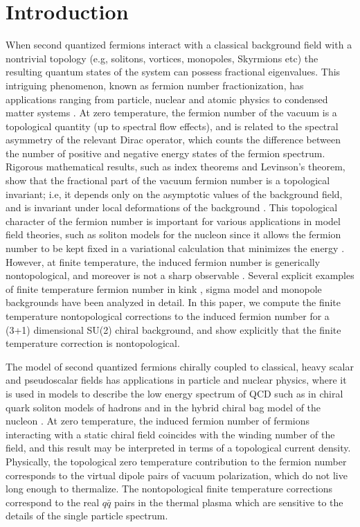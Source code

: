 \documentclass[a4paper,prd,showpacs,showkeys]{revtex4}
\begin{document}
\section{Introduction}
When second quantized fermions interact with  a classical background field with a nontrivial topology (e.g, solitons, vortices, monopoles, Skyrmions etc) the resulting quantum states of the system can possess fractional eigenvalues. This intriguing phenomenon, known as fermion number fractionization, has applications ranging from particle, nuclear and atomic physics to condensed matter systems \cite{jr,gold,jaffe,jackiw,wilczek,niemi,heeger,amo}. At zero temperature, the fermion number of the vacuum is a topological quantity (up to spectral flow effects), and is related to the spectral asymmetry of the relevant Dirac operator, which counts the difference between the number of positive and negative energy states of the fermion spectrum. Rigorous mathematical results, such as index theorems and Levinson's theorem, show that the fractional part of the vacuum fermion number is a topological invariant; i.e, it depends only on the asymptotic values of the background field, and is invariant under local deformations of the background \cite{niemi,macwilczek,boyanovsky,farhi}. This topological character of the fermion number is important for various applications in model field theories, such as soliton models for the nucleon since it allows the fermion number to be kept fixed in a variational calculation that minimizes the energy \cite{ripka,bhaduri,weigel}. However, at finite temperature, the induced fermion number is  generically nontopological, and moreover is not a sharp observable \cite{dunneian,dunne,fluc,nonlinearsigma}. Several explicit examples of finite temperature fermion number in kink \cite{semenoff,dunneian}, sigma model \cite{dunneian,fluc} and monopole \cite{cp,dunneian,feinberg} backgrounds have been analyzed in detail. In this paper, we compute the finite temperature nontopological corrections to the induced fermion number for a (3+1) dimensional SU(2) chiral background, and show explicitly that the finite temperature correction is nontopological.

The model of second quantized fermions chirally coupled to classical, heavy scalar and pseudoscalar fields has applications in particle and nuclear physics, where it is used in models to describe the low energy spectrum of QCD such as in chiral quark soliton models of hadrons \cite{diakonov,ball,ripka} and in the hybrid chiral bag model of the nucleon \cite{jaffe,bhaduri}. At zero temperature, the induced fermion number of fermions interacting with a static chiral field coincides with the winding number of the field, and this result may be interpreted in terms of a topological current density. Physically, the topological zero temperature contribution to the fermion number corresponds to the virtual dipole pairs of vacuum polarization, which do not live long enough to thermalize. The nontopological finite temperature corrections correspond to the real $q \bar{q}$ pairs in the thermal plasma which are sensitive to the details of the single particle spectrum. 
\end{document}
